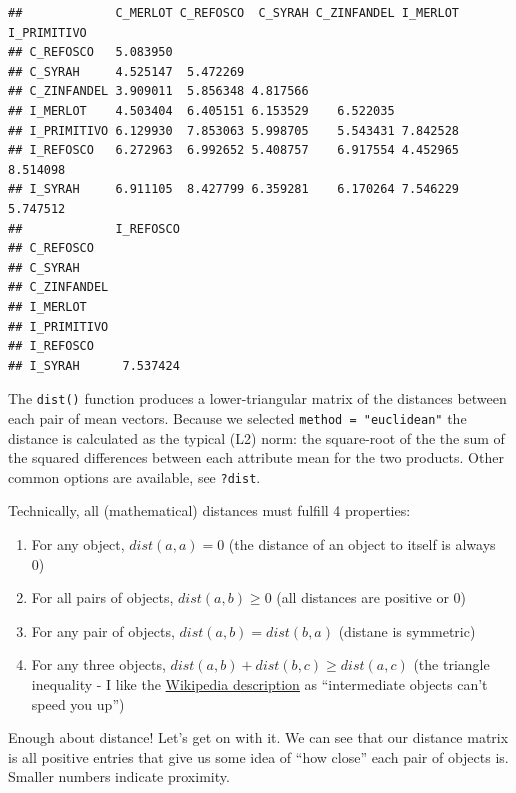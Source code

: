 \documentclass[
]{book}
\providecommand{\tightlist}{%
  \setlength{\itemsep}{0pt}\setlength{\parskip}{0pt}}
\begin{document}
\begin{verbatim}
##             C_MERLOT C_REFOSCO  C_SYRAH C_ZINFANDEL I_MERLOT I_PRIMITIVO
## C_REFOSCO   5.083950                                                    
## C_SYRAH     4.525147  5.472269                                          
## C_ZINFANDEL 3.909011  5.856348 4.817566                                 
## I_MERLOT    4.503404  6.405151 6.153529    6.522035                     
## I_PRIMITIVO 6.129930  7.853063 5.998705    5.543431 7.842528            
## I_REFOSCO   6.272963  6.992652 5.408757    6.917554 4.452965    8.514098
## I_SYRAH     6.911105  8.427799 6.359281    6.170264 7.546229    5.747512
##             I_REFOSCO
## C_REFOSCO            
## C_SYRAH              
## C_ZINFANDEL          
## I_MERLOT             
## I_PRIMITIVO          
## I_REFOSCO            
## I_SYRAH      7.537424
\end{verbatim}

The \texttt{dist()} function produces a lower-triangular matrix of the distances between each pair of mean vectors. Because we selected \texttt{method\ =\ "euclidean"} the distance is calculated as the typical (L2) norm: the square-root of the the sum of the squared differences between each attribute mean for the two products. Other common options are available, see \texttt{?dist}.

Technically, all (mathematical) distances must fulfill 4 properties:

\begin{enumerate}
\def\labelenumi{\arabic{enumi}.}
\tightlist
\item
  For any object, \(dist(a,a) = 0\) (the distance of an object to itself is always 0)
\item
  For all pairs of objects, \(dist(a,b) ≥ 0\) (all distances are positive or 0)
\item
  For any pair of objects, \(dist(a,b) = dist(b,a)\) (distane is symmetric)
\item
  For any three objects, \(dist(a,b) + dist(b,c) ≥ dist(a,c)\) (the triangle inequality - I like the \href{https://en.wikipedia.org/wiki/Distance\#Mathematical_formalization}{Wikipedia description} as ``intermediate objects can't speed you up'')
\end{enumerate}

Enough about distance! Let's get on with it. We can see that our distance matrix is all positive entries that give us some idea of ``how close'' each pair of objects is. Smaller numbers indicate proximity.
\end{document}
